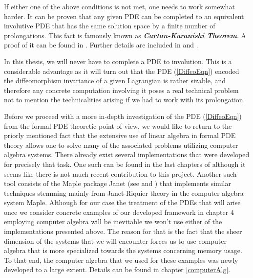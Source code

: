 If either one of the above conditions is not met, one needs to work somewhat harder. It can be proven that any given PDE can be completed to an equivalent involutive PDE that has the same solution space by a finite number of prolongations. This fact is famously known as \textbf{\textit{Cartan-Kuranishi Theorem}}. A proof of it can be found in \cite{sweeney1968}. Further details are included in \cite{seiler2009involution} and \cite{seiler1994analysis}.

In this thesis, we will never have to complete a PDE to involution. This is a considerable advantage as it will turn out that the PDE (\ref{DiffeoEqn}) encoded the diffeomorphism invariance of a given Lagrangian is rather sizable, and therefore any concrete computation involving it poses a real technical problem not to mention the technicalities arising if we had to work with its prolongation. 

Before we proceed with a more in-depth investigation of the PDE (\ref{DiffeoEqn}) from the formal PDE theoretic point of view, we would like to return to the priorly mentioned fact that the extensive use of linear algebra in formal PDE theory allows one to solve many of the associated problems utilizing computer algebra systems. There already exist several implementations that were developed for precisely that task. One such can be found in the last chapters of \cite{seiler1994analysis} although it seems like there is not much recent contribution to this project. Another such tool consists of the Maple package Janet (see \cite{Janet2} and \cite{Janet}) that implements similar techniques stemming mainly from Janet-Riquier theory in the computer algebra system Maple. 
Although for our case the treatment of the PDEs that will arise once we consider concrete examples of our developed framework in chapter 4 employing computer algebra will be inevitable we won't use either of the implementations presented above. The reason for that is the fact that the sheer dimension of the systems that we will encounter forces us to use computer algebra that is more specialized towards the systems concerning memory usage. To that end, the computer algebra that we used for these examples was newly developed to a large extent. Details can be found in chapter \ref{computerAlg}.    

